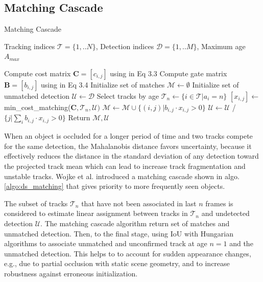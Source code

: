 \subsection{Matching Cascade}
\begin{algorithm}
\caption{Matching Cascade}\label{algo:ds_matching}
\begin{algorithmic}[1]
\INPUT Tracking indices $\mathcal{T} = \{1, .. N\}$, Detection indices $\mathcal{D} = \{1, .. M\}$, Maximum age $A_{max}$

\State Compute cost matrix $\mathbf{C} = [c_{i,j}]$ using in Eq 3.3
\State Compute gate matrix $\mathbf{B} = [b_{i,j}]$ using in Eq 3.4
\State Initialize set of matches $\mathcal{M} \leftarrow \emptyset$
\State Initialize set of unmatched detection $\mathcal{U}\leftarrow\mathcal{D}$
\State Select tracks by age $\mathcal{T}_n \leftarrow \{i \in \mathcal{T} | a_i = n\}$
\State $[x_{i,j}]\leftarrow$ min\_cost\_matching($\mathbf{C}, \mathcal{T}_n, \mathcal{U})$
\State $\mathcal{M} \leftarrow \mathcal{M} \cup \{(i,j) | b_{i,j}\cdot x_{i,j} > 0 \}$
\State $\mathcal{U} \leftarrow \mathcal{U}$ /\ $\{j |\underset{i}{\sum}b_{i,j}\cdot x_{i,j} > 0 \}$
\EndFor
\State Return $\mathcal{M}, \mathcal{U}$
\end{algorithmic}
\end{algorithm}
When an object is occluded for a longer period of time and two tracks compete for the same
detection, the Mahalanobis distance favors uncertainty, because it effectively reduces the
distance in the standard deviation of any detection toward the projected
track mean which can lead to increase track fragmentation and unstable tracks.\cite{Wojke2017simple}
Wojke et al.\cite{Wojke2017simple} introduced a matching cascade shown in algo.\ref{algo:ds_matching}
that gives priority to more frequently seen objects.\par
The subset of tracks $\mathcal{T}_n$ that have not been associated in last $n$
frames is considered to estimate linear assignment between tracks in $\mathcal{T}_n$ and undetected
detection $\mathcal{U}$. The matching cascade algorithm return set of matches and unmatched
detection. Then, to the final stage, using \acrshort{IoU} with Hungarian
algorithms to associate unmatched and unconfirmed track at age $n=1$ and the unmatched detection. This helps to to account for sudden appearance changes, e.g., due to partial occlusion with static scene geometry, and to
increase robustness against erroneous initialization\cite{Wojke2017simple}.\par



